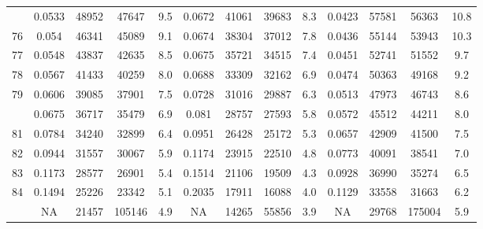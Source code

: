 \documentclass[
  14pt,
]{article}
\begin{document}
\begin{longtable}[t]{lcccccccccccc}
\addlinespace
75 & 0.0533 & 48952 & 47647 & 9.5 & 0.0672 & 41061 & 39683 & 8.3 & 0.0423 & 57581 & 56363 & 10.8\\
76 & 0.054 & 46341 & 45089 & 9.1 & 0.0674 & 38304 & 37012 & 7.8 & 0.0436 & 55144 & 53943 & 10.3\\
77 & 0.0548 & 43837 & 42635 & 8.5 & 0.0675 & 35721 & 34515 & 7.4 & 0.0451 & 52741 & 51552 & 9.7\\
78 & 0.0567 & 41433 & 40259 & 8.0 & 0.0688 & 33309 & 32162 & 6.9 & 0.0474 & 50363 & 49168 & 9.2\\
79 & 0.0606 & 39085 & 37901 & 7.5 & 0.0728 & 31016 & 29887 & 6.3 & 0.0513 & 47973 & 46743 & 8.6\\
\addlinespace
80 & 0.0675 & 36717 & 35479 & 6.9 & 0.081 & 28757 & 27593 & 5.8 & 0.0572 & 45512 & 44211 & 8.0\\
81 & 0.0784 & 34240 & 32899 & 6.4 & 0.0951 & 26428 & 25172 & 5.3 & 0.0657 & 42909 & 41500 & 7.5\\
82 & 0.0944 & 31557 & 30067 & 5.9 & 0.1174 & 23915 & 22510 & 4.8 & 0.0773 & 40091 & 38541 & 7.0\\
83 & 0.1173 & 28577 & 26901 & 5.4 & 0.1514 & 21106 & 19509 & 4.3 & 0.0928 & 36990 & 35274 & 6.5\\
84 & 0.1494 & 25226 & 23342 & 5.1 & 0.2035 & 17911 & 16088 & 4.0 & 0.1129 & 33558 & 31663 & 6.2\\
\addlinespace
85 & NA & 21457 & 105146 & 4.9 & NA & 14265 & 55856 & 3.9 & NA & 29768 & 175004 & 5.9\\*
\end{longtable}
\end{document}
